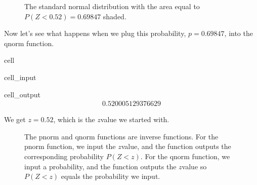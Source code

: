 \documentclass[letterpaper,10pt,english]{jupyterBook}
\begin{document}
\begin{figure}[htbp]
\centering
\capstart

\noindent{}
\caption{The standard normal distribution with the area equal to \(P(Z < 0.52) = 0.69847\) shaded.}\label{\detokenize{Ch4 The Normal Distribution and the Central Limit Theorem/4.2 The Standard Normal Distribution:stdnormal-ex3}}\end{figure}

\sphinxAtStartPar
Now let’s see what happens when we plug this probability, \(p = 0.69847\), into the qnorm function.

\begin{sphinxuseclass}{cell}\begin{sphinxVerbatimInput}

\begin{sphinxuseclass}{cell_input}
\begin{sphinxVerbatim}[commandchars=\\\{\}]
\end{sphinxVerbatim}

\end{sphinxuseclass}\end{sphinxVerbatimInput}
\begin{sphinxVerbatimOutput}

\begin{sphinxuseclass}{cell_output}\begin{equation*}
\begin{split}0.520005129376629\end{split}
\end{equation*}
\end{sphinxuseclass}\end{sphinxVerbatimOutput}

\end{sphinxuseclass}
\sphinxAtStartPar
We get \(z = 0.52\), which is the \(z\)\sphinxhyphen{}value we started with.

\begin{figure}[htbp]
\centering
\capstart

\noindent{}
\caption{The pnorm and qnorm functions are inverse functions. For the pnorm function, we input the \(z\)\sphinxhyphen{}value, and the function outputs the corresponding probability \(P(Z < z)\). For the qnorm function, we input a probability, and the function outputs the \(z\)\sphinxhyphen{}value so \(P(Z < z)\) equals the probability we input.}\label{\detokenize{Ch4 The Normal Distribution and the Central Limit Theorem/4.2 The Standard Normal Distribution:pnorm-qnorm-inv}}\end{figure}
\end{document}
